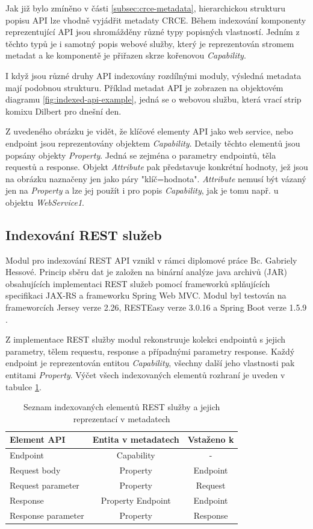 \documentclass[czech,DP]{thesiskiv}
\begin{document}
Jak již bylo zmíněno v části \ref{subsec:crce-metadata}, hierarchickou strukturu popisu API lze vhodně vyjádřit metadaty CRCE. Během indexování komponenty reprezentující API jsou shromážděny různé typy popisných vlastností. Jedním z těchto typů je i samotný popis webové služby, který je reprezentován stromem metadat a ke komponentě je přiřazen skrze  kořenovou \textit{Capability}.   

I když jsou různé druhy API indexovány rozdílnými moduly, výsledná metadata mají podobnou strukturu. Příklad metadat API je zobrazen na objektovém diagramu \ref{fig:indexed-api-example}, jedná se o webovou službu, která vrací strip komixu Dilbert pro dnešní den.

Z uvedeného obrázku je vidět, že klíčové elementy API jako web service, nebo endpoint jsou reprezentovány objektem \textit{Capability}. Detaily těchto elementů jsou popsány objekty \textit{Property}. Jedná se zejména o parametry endpointů, těla requestů a response. Objekt \textit{Attribute} pak představuje konkrétní hodnoty, jež jsou na obrázku naznačeny jen jako páry "klíč=hodnota". \textit{Attribute} nemusí být vázaný jen na \textit{Property} a lze jej použít i pro popis \textit{Capability}, jak je tomu např. u objektu \textit{WebService1}.

\subsection{Indexování REST služeb}

Modul pro indexování REST API vznikl v rámci diplomové práce Bc. Gabriely Hessové. Princip sběru dat je založen na binární analýze java archivů (JAR) obsahujících implementaci REST služeb pomocí frameworků splňujících specifikaci JAX-RS a frameworku Spring Web MVC. Modul byl testován na frameworcích Jersey verze 2.26, RESTEasy verze 3.0.16 a  Spring Boot verze 1.5.9 \cite{hessova2015rest}.

Z implementace REST služby modul rekonstruuje kolekci endpointů s jejich parametry, tělem requestu, response a případnými parametry response. Každý endpoint je reprezentován entitou \textit{Capability}, všechny další jeho vlastnosti pak entitami \textit{Property}. Výčet všech indexovaných elementů rozhraní je uveden v tabulce \ref{tab:rest-indexed}.

\begin{table}[h]
	\centering
	\begin{tabular}{|l | c | c |}
		\hline
		Element API & Entita v metadatech & Vstaženo k\\
		\hline
		\hline
		Endpoint & Capability & - \\
		\hline
		Request body & Property & Endpoint \\
		\hline
		Request parameter & Property & Request \\
		\hline
		Response & Property Endpoint & Endpoint \\
		\hline
		Response parameter & Property & Response \\
		\hline
	\end{tabular}
	\caption{Seznam indexovaných elementů REST služby a jejich reprezentací v metadatech}
	\label{tab:rest-indexed}
\end{table}
\end{document}
